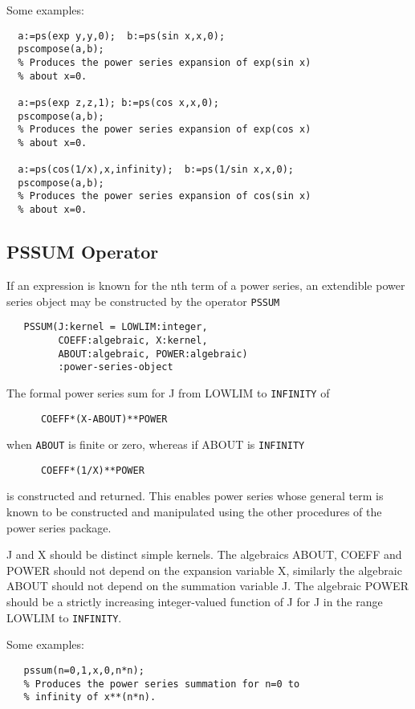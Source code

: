 {Some examples:
\begin{verbatim}
  a:=ps(exp y,y,0);  b:=ps(sin x,x,0);
  pscompose(a,b);
  % Produces the power series expansion of exp(sin x)
  % about x=0.

  a:=ps(exp z,z,1); b:=ps(cos x,x,0);
  pscompose(a,b);
  % Produces the power series expansion of exp(cos x)
  % about x=0.

  a:=ps(cos(1/x),x,infinity);  b:=ps(1/sin x,x,0);
  pscompose(a,b);
  % Produces the power series expansion of cos(sin x)
  % about x=0.
\end{verbatim}

\subsection{PSSUM Operator}
\hypertarget{operator:PSSUM}{}
If an expression is known for the nth term of a power series, an extendible
power series object may be constructed by the operator \texttt{PSSUM}

\begin{verbatim}
   PSSUM(J:kernel = LOWLIM:integer, 
         COEFF:algebraic, X:kernel, 
         ABOUT:algebraic, POWER:algebraic)
         :power-series-object
\end{verbatim}

The formal power series sum for J from LOWLIM to \texttt{INFINITY} of
\begin{verbatim}
      COEFF*(X-ABOUT)**POWER
\end{verbatim}
when \texttt{ABOUT} is finite or zero, whereas if ABOUT is \texttt{INFINITY}
\begin{verbatim}
      COEFF*(1/X)**POWER
\end{verbatim}
is constructed and returned. This enables power series whose general
term is known to be constructed and manipulated using the other
procedures of the power series package.

J and X should be distinct simple kernels. The algebraics
ABOUT,  COEFF and POWER should not depend on the
expansion variable X, similarly the algebraic ABOUT should
not depend on the summation variable J.  The algebraic POWER should be
a strictly increasing integer-valued function of J for J in the range
LOWLIM to \texttt{INFINITY}.

Some examples:
\begin{verbatim}
   pssum(n=0,1,x,0,n*n);
   % Produces the power series summation for n=0 to
   % infinity of x**(n*n).


\end{verbatim}}
